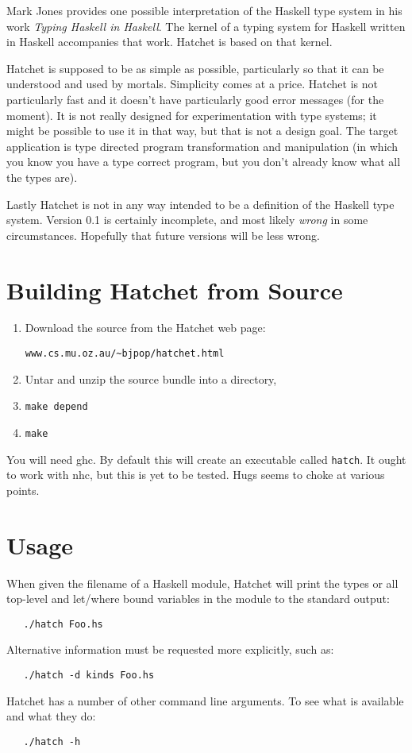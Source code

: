\documentclass{article}
\begin{document}
Mark Jones provides one possible interpretation of the Haskell
type system in his work \emph{Typing Haskell in Haskell}. 
The kernel of a typing system for Haskell written in Haskell
accompanies that work. Hatchet is based on that kernel.

Hatchet is supposed to be as simple as possible, particularly
so that it can be understood and used by mortals. Simplicity
comes at a price. Hatchet is not particularly fast and it doesn't
have particularly good error messages (for the moment).
It is not really designed for experimentation with type systems;
it might be possible to use it in that way, but that is not a
design goal. The target application is type directed 
program transformation and manipulation (in which you know you
have a type correct program, but you don't already know what all
the types are).

Lastly Hatchet is not in any way intended to be a definition of
the Haskell type system. Version 0.1 is certainly incomplete,
and most likely \emph{wrong} in some circumstances. Hopefully that 
future versions will be less wrong. 

\section{Building Hatchet from Source}

\begin{enumerate}
\item Download the source from the Hatchet web page: 
\begin{verbatim}
www.cs.mu.oz.au/~bjpop/hatchet.html
\end{verbatim}
\item Untar and unzip the source bundle into a directory,
\item \texttt{make depend}
\item \texttt{make}
\end{enumerate}

You will need ghc. By default this will create an executable called
\texttt{hatch}. It ought to work with nhc, but this is yet to be tested.
Hugs seems to choke at various points. 

\section{Usage}

When given the filename of a Haskell module, Hatchet will print the types
or all top-level and let/where bound variables in the module to the standard
output:
\begin{verbatim}
   ./hatch Foo.hs
\end{verbatim}
Alternative information must be requested more explicitly, such as:
\begin{verbatim}
   ./hatch -d kinds Foo.hs
\end{verbatim}
Hatchet has a number of other command line arguments. To see what is
available and what they do:
\begin{verbatim}
   ./hatch -h 
\end{verbatim}
\end{document}
